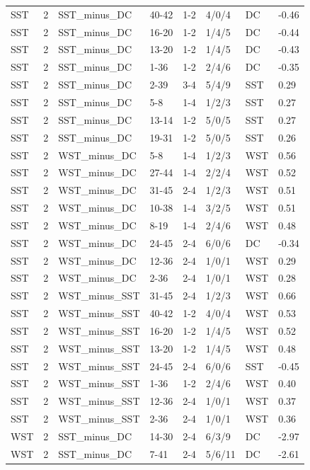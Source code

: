 \begin{table}[!h]
\begin{tabular}[t]{lrllllll}
SST & 2 & SST_minus_DC & 40-42 & 1-2 & 4/0/4 & DC & -0.46\\
SST & 2 & SST_minus_DC & 16-20 & 1-2 & 1/4/5 & DC & -0.44\\
\addlinespace
SST & 2 & SST_minus_DC & 13-20 & 1-2 & 1/4/5 & DC & -0.43\\
SST & 2 & SST_minus_DC & 1-36 & 1-2 & 2/4/6 & DC & -0.35\\
SST & 2 & SST_minus_DC & 2-39 & 3-4 & 5/4/9 & SST & 0.29\\
SST & 2 & SST_minus_DC & 5-8 & 1-4 & 1/2/3 & SST & 0.27\\
SST & 2 & SST_minus_DC & 13-14 & 1-2 & 5/0/5 & SST & 0.27\\
\addlinespace
SST & 2 & SST_minus_DC & 19-31 & 1-2 & 5/0/5 & SST & 0.26\\
SST & 2 & WST_minus_DC & 5-8 & 1-4 & 1/2/3 & WST & 0.56\\
SST & 2 & WST_minus_DC & 27-44 & 1-4 & 2/2/4 & WST & 0.52\\
SST & 2 & WST_minus_DC & 31-45 & 2-4 & 1/2/3 & WST & 0.51\\
SST & 2 & WST_minus_DC & 10-38 & 1-4 & 3/2/5 & WST & 0.51\\
\addlinespace
SST & 2 & WST_minus_DC & 8-19 & 1-4 & 2/4/6 & WST & 0.48\\
SST & 2 & WST_minus_DC & 24-45 & 2-4 & 6/0/6 & DC & -0.34\\
SST & 2 & WST_minus_DC & 12-36 & 2-4 & 1/0/1 & WST & 0.29\\
SST & 2 & WST_minus_DC & 2-36 & 2-4 & 1/0/1 & WST & 0.28\\
SST & 2 & WST_minus_SST & 31-45 & 2-4 & 1/2/3 & WST & 0.66\\
\addlinespace
SST & 2 & WST_minus_SST & 40-42 & 1-2 & 4/0/4 & WST & 0.53\\
SST & 2 & WST_minus_SST & 16-20 & 1-2 & 1/4/5 & WST & 0.52\\
SST & 2 & WST_minus_SST & 13-20 & 1-2 & 1/4/5 & WST & 0.48\\
SST & 2 & WST_minus_SST & 24-45 & 2-4 & 6/0/6 & SST & -0.45\\
SST & 2 & WST_minus_SST & 1-36 & 1-2 & 2/4/6 & WST & 0.40\\
\addlinespace
SST & 2 & WST_minus_SST & 12-36 & 2-4 & 1/0/1 & WST & 0.37\\
SST & 2 & WST_minus_SST & 2-36 & 2-4 & 1/0/1 & WST & 0.36\\
WST & 2 & SST_minus_DC & 14-30 & 2-4 & 6/3/9 & DC & -2.97\\
WST & 2 & SST_minus_DC & 7-41 & 2-4 & 5/6/11 & DC & -2.61\\

\end{tabular}
\end{table}
